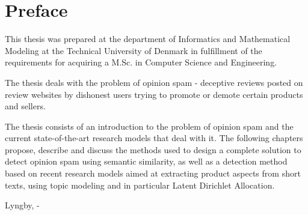 \chapter{Preface}

This thesis was prepared at the department of Informatics and Mathematical Modeling at the Technical University of Denmark in fulfillment of the requirements for acquiring a M.Sc. in Computer Science and Engineering.

The thesis deals with the problem of opinion spam - deceptive reviews posted on review websites by dishonest users trying to promote or demote certain products and sellers.

The thesis consists of an introduction to the problem of opinion spam and the current state-of-the-art research models that deal with it. The following chapters propose, describe and discuss the methods used to design a complete solution to detect opinion spam using semantic similarity, as well as a detection method based on recent research models aimed at extracting product aspects from short texts, using topic modeling and in particular Latent Dirichlet Allocation.

\vspace{20mm}
\begin{center}
    \hspace{20mm} Lyngby, \thesishandin-\thesisyear
    \vspace{10mm}
    \newline
    \thesisauthor
\end{center}
